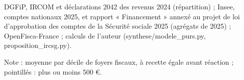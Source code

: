 DGFiP, IRCOM et déclarations 2042 des revenus 2024 (répartition) ; Insee, comptes nationaux 2025, et rapport « Financement » annexé au projet de loi d'approbation des comptes de la Sécurité sociale 2025 (agrégats de 2025) ; OpenFisca-France ; calculs de l'auteur (synthese/modele\_purs.py, proposition\_ircsg.py).\par Note : moyenne par décile de foyers fiscaux, à recette égale avant réaction ; pointillés : plus ou moins 500 \euro{}.
